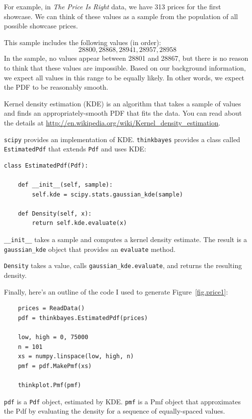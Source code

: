 \documentclass[12pt]{book}
\begin{document}
For example, in {\it The Price Is Right} data, we have
313 prices for the first showcase.  We can think of these
values as a sample from the population of all possible showcase
prices.

This sample includes the following values (in order):
%
\[ 28800, 28868, 28941, 28957, 28958 \]
%
In the sample, no values appear between 28801 and 28867, but
there is no reason to think that these values are impossible.
Based on our background information, we expect all
values in this range to be equally likely.  In other words,
we expect the PDF to be reasonably smooth.

Kernel density estimation (KDE) is an algorithm that takes
a sample of values and finds an appropriately-smooth PDF that fits 
the data.  You can read about the details at
\url{http://en.wikipedia.org/wiki/Kernel_density_estimation}.

{\tt scipy} provides an implementation of KDE.  {\tt thinkbayes}
provides a class called {\tt EstimatedPdf} that extends {\tt Pdf}
and uses KDE:

\begin{verbatim}
class EstimatedPdf(Pdf):

    def __init__(self, sample):
        self.kde = scipy.stats.gaussian_kde(sample)

    def Density(self, x):
        return self.kde.evaluate(x)
\end{verbatim}

\verb"__init__" takes a sample
and computes a kernel density estimate.  The result is a
\verb"gaussian_kde" object that provides an {\tt evaluate}
method.

{\tt Density} takes a value, calls \verb"gaussian_kde.evaluate",
and returns the resulting density.

Finally, here's an outline of the code I used to generate
Figure~\ref{fig.price1}:

\begin{verbatim}
    prices = ReadData()
    pdf = thinkbayes.EstimatedPdf(prices)

    low, high = 0, 75000
    n = 101
    xs = numpy.linspace(low, high, n) 
    pmf = pdf.MakePmf(xs)

    thinkplot.Pmf(pmf)
\end{verbatim}

{\tt pdf} is a {\tt Pdf} object, estimated by KDE.  {\tt pmf}
is a Pmf object that approximates the Pdf by evaluating the density
for a sequence of equally-spaced values.
\end{document}
